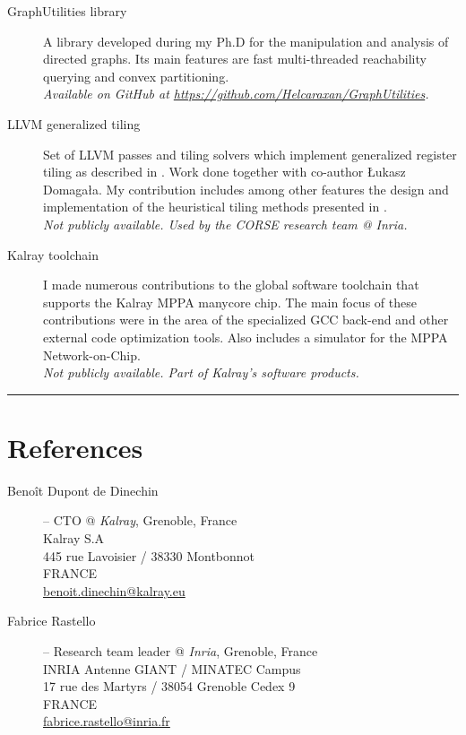 \documentclass[english,9pt]{extarticle}
\begin{document}
\begin{adjustwidth}{1em}{}
	\begin{description}
		\item[GraphUtilities library] A library developed during my Ph.D for the manipulation and
			analysis of directed graphs. Its main features are fast multi-threaded reachability querying
			and convex partitioning. \\
			\textit{Available on GitHub at \url{https://github.com/Helcaraxan/GraphUtilities}.}
		\item[LLVM generalized tiling] Set of LLVM passes and tiling solvers which implement generalized
			register tiling as described in \cite{domagala:register_tiling:2016}. Work done together with
			co-author \L{}ukasz Domaga\l{}a. My contribution includes among other features the design and
			implementation of the heuristical tiling methods presented in
			\cite{domagala:dataflow_tiling:2016,vanamstel:data_locality:2016}. \\
			\textit{Not publicly available. Used by the CORSE research team @ Inria.}
		\item[Kalray toolchain] I made numerous contributions to the global software toolchain that
			supports the Kalray MPPA manycore chip. The main focus of these contributions were in the area
			of the specialized GCC back-end and other external code optimization tools. Also includes a
			simulator for the MPPA Network-on-Chip. \\
			\textit{Not publicly available. Part of Kalray's software products.}
	\end{description}
\end{adjustwidth}


\noindent\rule{\textwidth}{1pt}

\section*{References}
\begin{adjustwidth}{1em}{}
	\begin{description}
		\item[Benoît Dupont de Dinechin] -- CTO @ \textit{Kalray}, Grenoble, France \\
			Kalray S.A \\
			445 rue Lavoisier / 38330 Montbonnot \\
			FRANCE \\
			\href{mailto:benoit.dinechin@kalray.eu}{benoit.dinechin@kalray.eu}
		\item[Fabrice Rastello] -- Research team leader @ \textit{Inria}, Grenoble, France \\
			INRIA Antenne GIANT / MINATEC Campus \\
			17 rue des Martyrs / 38054 Grenoble Cedex 9 \\
			FRANCE \\
			\href{mailto:fabrice.rastello@inria.fr}{fabrice.rastello@inria.fr}
	\end{description}
\end{adjustwidth}
\end{document}
